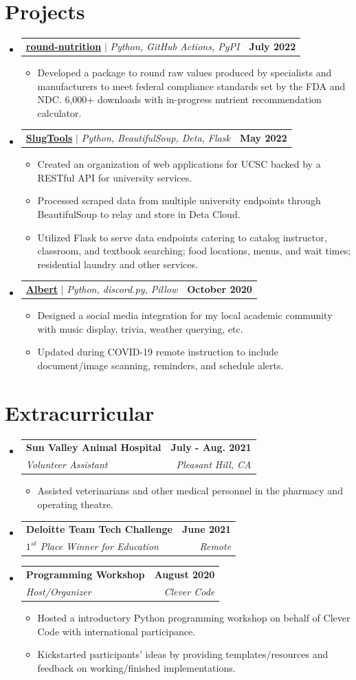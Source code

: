 \documentclass[letterpaper,11pt]{article}
\makeatletter
\newcommand{\resumeItem}[1]{
  \item\small{
    {#1 \vspace{-2pt}}
  }
}
\newcommand{\resumeSubheading}[4]{
  \vspace{-2pt}\item
    \begin{tabular*}{1.0\textwidth}[t]{l@{\extracolsep{\fill}}r}
      \textbf{#1} & \textbf{\small #2} \\
      \textit{\small#3} & \textit{\small #4} \\
    \end{tabular*}\vspace{-7pt}
}
\newcommand{\resumeProjectHeading}[2]{
    \item
    \begin{tabular*}{1.001\textwidth}{l@{\extracolsep{\fill}}r}
      \small#1 & \textbf{\small #2}\\
    \end{tabular*}\vspace{-7pt}
}
\newcommand{\resumeSubHeadingListStart}{\begin{itemize}[leftmargin=0.0in, label={}]}
\newcommand{\resumeSubHeadingListEnd}{\end{itemize}}
\newcommand{\resumeItemListStart}{\begin{itemize}}
\newcommand{\resumeItemListEnd}{\end{itemize}\vspace{-5pt}}
\makeatother
\begin{document}
\section{Projects}
\vspace{-5pt}
\resumeSubHeadingListStart
\resumeProjectHeading
{\textbf{\color[HTML]{0000EE}\href{https://pypi.org/project/round-nutrition/}{round-nutrition}} $|$ \emph{Python, GitHub Actions, PyPI}}{July 2022}
\resumeItemListStart
\resumeItem{Developed a package to round raw values produced by specialists and manufacturers to meet federal compliance standards set by the FDA and NDC. 6,000+ downloads with in-progress nutrient recommendation calculator.}
\resumeItemListEnd
\vspace{-13pt}
\resumeProjectHeading
{\textbf{\color[HTML]{0000EE}\href{https://api.slug.tools}{SlugTools}} $|$ \emph{Python, BeautifulSoup, Deta, Flask}}{May 2022}
\resumeItemListStart
\resumeItem{Created an organization of web applications for UCSC backed by a RESTful API for university services.}
\resumeItem{Processed scraped data from multiple university endpoints through BeautifulSoup to relay and store in Deta Cloud.}
\resumeItem{Utilized Flask to serve data endpoints catering to catalog instructor, classroom, and textbook searching; food locations, menus, and wait times; residential laundry and other services.}
\resumeItemListEnd
\vspace{-13pt}
\resumeProjectHeading
{\textbf{\color[HTML]{0000EE}\href{https://github.com/hdadhich01/Albert}{Albert}} $|$ \emph{Python, discord.py, Pillow}}{October 2020}
\resumeItemListStart
\resumeItem{Designed a social media integration for my local academic community with music display, trivia, weather querying, etc.}
\resumeItem{Updated during COVID-19 remote instruction to include document/image scanning, reminders, and schedule alerts.}
\resumeItemListEnd
\resumeSubHeadingListEnd
\vspace{-15pt}

\section{Extracurricular}
\resumeSubHeadingListStart
\resumeSubheading{Sun Valley Animal Hospital}{July - Aug. 2021}{Volunteer Assistant}{Pleasant Hill, CA}
\resumeItemListStart
\resumeItem{Assisted veterinarians and other medical personnel in the pharmacy and operating theatre.}
\resumeItemListEnd
\resumeSubheading{Deloitte Team Tech Challenge}{June 2021}{$1^{st}$ Place Winner for Education}{Remote}
\resumeSubheading{Programming Workshop}{August 2020}{Host/Organizer}{Clever Code}
\resumeItemListStart
\resumeItem{Hosted a introductory Python programming workshop on behalf of Clever Code with international participance.}
\resumeItem{Kickstarted participants' ideas by providing templates/resources and feedback on working/finished implementations.}
\resumeItemListEnd
\resumeSubHeadingListEnd
\vspace{-15pt}
\end{document}
